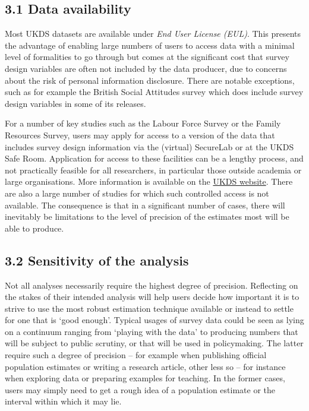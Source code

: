 \documentclass[
  14,
  a4paper,
  DIV=11,
  numbers=noendperiod]{scrartcl}
\begin{document}
\hypertarget{data-availability}{%
\subsection{3.1 Data availability}\label{data-availability}}

Most UKDS datasets are available under \emph{End User License (EUL)}.
This presents the advantage of enabling large numbers of users to access
data with a minimal level of formalities to go through but comes at the
significant cost that survey design variables are often not included by
the data producer, due to concerns about the risk of personal
information disclosure. There are notable exceptions, such as for
example the British Social Attitudes survey which does include survey
design variables in some of its releases.

For a number of key studies such as the Labour Force Survey or the
Family Resources Survey, users may apply for access to a version of the
data that includes survey design information via the (virtual) SecureLab
or at the UKDS Safe Room. Application for access to these facilities can
be a lengthy process, and not practically feasible for all researchers,
in particular those outside academia or large organisations. More
information is available on the
\href{https://ukdataservice.ac.uk/help/access-policy/types-of-data-access/}{UKDS
website}. There are also a large number of studies for which such
controlled access is not available. The consequence is that in a
significant number of cases, there will inevitably be limitations to the
level of precision of the estimates most will be able to produce.

\hypertarget{sensitivity-of-the-analysis}{%
\subsection{3.2 Sensitivity of the
analysis}\label{sensitivity-of-the-analysis}}

Not all analyses necessarily require the highest degree of precision.
Reflecting on the stakes of their intended analysis will help users
decide how important it is to strive to use the most robust estimation
technique available or instead to settle for one that is `good enough'.
Typical usages of survey data could be seen as lying on a continuum
ranging from `playing with the data' to producing numbers that will be
subject to public scrutiny, or that will be used in policymaking. The
latter require such a degree of precision -- for example when publishing
official population estimates or writing a research article, other less
so -- for instance when exploring data or preparing examples for
teaching. In the former cases, users may simply need to get a rough idea
of a population estimate or the interval within which it may lie.
\end{document}
